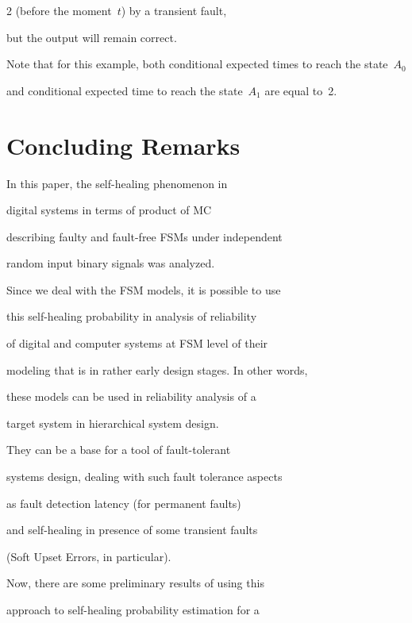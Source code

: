 \begin{multicols}{2}
(before the moment~$t$) by a transient fault,

but the output will remain correct.

{



}





Note that for this example, both conditional expected times to reach the state~$A_0$

and conditional expected time to reach the state~$A_1$  are equal to~2.




\section{Concluding Remarks}



\noindent

In this paper, the self-healing phenomenon in

digital systems in terms of product of MC

describing faulty and fault-free FSMs under independent

random input binary signals was  analyzed.

Since we deal with the FSM models, it is possible to use

this self-healing probability in analysis of  reliability

of digital and computer systems at FSM level of their

modeling that is in rather early design stages. In other words,

these models can be used in  reliability analysis of a

target system in hierarchical system design.

They can be a base for a tool of fault-tolerant

systems design, dealing with such fault tolerance aspects

as fault detection latency (for permanent faults)~\cite{8fr}

and self-healing in presence of some transient faults

(Soft Upset Errors, in particular).

Now, there are some preliminary results of using this

approach to self-healing probability estimation for a


\end{multicols}
